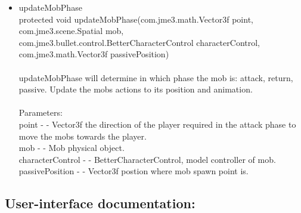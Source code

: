 \documentclass[letterpaper]{article}
\begin{document}
\begin{itemize}
\begin{itemize}
									\item	updateMobPhase \\
											protected void updateMobPhase(com.jme3.math.Vector3f point, \\
		                  com.jme3.scene.Spatial mob, \\
		                  com.jme3.bullet.control.BetterCharacterControl characterControl, \\
		                  com.jme3.math.Vector3f passivePosition) \\ \\
											updateMobPhase will determine in which phase the mob is: attack, return, passive. Update the mobs actions to its position and animation. \\ \\
											Parameters: \\
											point - - Vector3f the direction of the player required in the attack phase to move the mobs towards the player. \\
											mob - - Mob physical object. \\
											characterControl - - BetterCharacterControl, model controller of mob. \\
											passivePosition - - Vector3f postion where mob spawn point is.
								\end{itemize}
					\end{itemize}
			
			\vspace{0.2in}
			\subsection*{User-interface documentation:}
			\vspace{0.1in}
			
\end{document}
